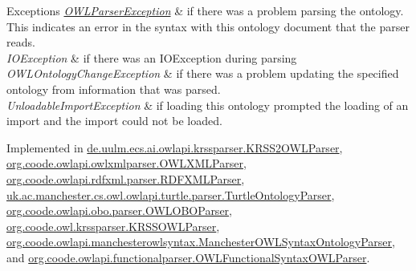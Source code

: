 \begin{DoxyExceptions}{Exceptions}
{\em \hyperlink{classorg_1_1semanticweb_1_1owlapi_1_1io_1_1_o_w_l_parser_exception}{O\-W\-L\-Parser\-Exception}} & if there was a problem parsing the ontology. This indicates an error in the syntax with this ontology document that the parser reads. \\
\hline
{\em I\-O\-Exception} & if there was an I\-O\-Exception during parsing \\
\hline
{\em O\-W\-L\-Ontology\-Change\-Exception} & if there was a problem updating the specified ontology from information that was parsed. \\
\hline
{\em Unloadable\-Import\-Exception} & if loading this ontology prompted the loading of an import and the import could not be loaded. \\
\hline
\end{DoxyExceptions}


Implemented in \hyperlink{classde_1_1uulm_1_1ecs_1_1ai_1_1owlapi_1_1krssparser_1_1_k_r_s_s2_o_w_l_parser_a7b040e07a34e8fa3dc9bd3b8a9d3b152}{de.\-uulm.\-ecs.\-ai.\-owlapi.\-krssparser.\-K\-R\-S\-S2\-O\-W\-L\-Parser}, \hyperlink{classorg_1_1coode_1_1owlapi_1_1owlxmlparser_1_1_o_w_l_x_m_l_parser_a22bf6d7db0222e2c44a91d95e17419b5}{org.\-coode.\-owlapi.\-owlxmlparser.\-O\-W\-L\-X\-M\-L\-Parser}, \hyperlink{classorg_1_1coode_1_1owlapi_1_1rdfxml_1_1parser_1_1_r_d_f_x_m_l_parser_aad6ddc90f0213a8ef6702eb8a20aa5c2}{org.\-coode.\-owlapi.\-rdfxml.\-parser.\-R\-D\-F\-X\-M\-L\-Parser}, \hyperlink{classuk_1_1ac_1_1manchester_1_1cs_1_1owl_1_1owlapi_1_1turtle_1_1parser_1_1_turtle_ontology_parser_a0f952a33b23d0399c5c01bce4415095f}{uk.\-ac.\-manchester.\-cs.\-owl.\-owlapi.\-turtle.\-parser.\-Turtle\-Ontology\-Parser}, \hyperlink{classorg_1_1coode_1_1owlapi_1_1obo_1_1parser_1_1_o_w_l_o_b_o_parser_aab30605317c3e6b3e1388eae9caaf7e4}{org.\-coode.\-owlapi.\-obo.\-parser.\-O\-W\-L\-O\-B\-O\-Parser}, \hyperlink{classorg_1_1coode_1_1owl_1_1krssparser_1_1_k_r_s_s_o_w_l_parser_ab002825f3234dfadd985eae88a845d25}{org.\-coode.\-owl.\-krssparser.\-K\-R\-S\-S\-O\-W\-L\-Parser}, \hyperlink{classorg_1_1coode_1_1owlapi_1_1manchesterowlsyntax_1_1_manchester_o_w_l_syntax_ontology_parser_acb907df8a62c334cdb0951c015a94b7e}{org.\-coode.\-owlapi.\-manchesterowlsyntax.\-Manchester\-O\-W\-L\-Syntax\-Ontology\-Parser}, and \hyperlink{classorg_1_1coode_1_1owlapi_1_1functionalparser_1_1_o_w_l_functional_syntax_o_w_l_parser_a94dd34895ca7ac191b9feabed1d09449}{org.\-coode.\-owlapi.\-functionalparser.\-O\-W\-L\-Functional\-Syntax\-O\-W\-L\-Parser}.

